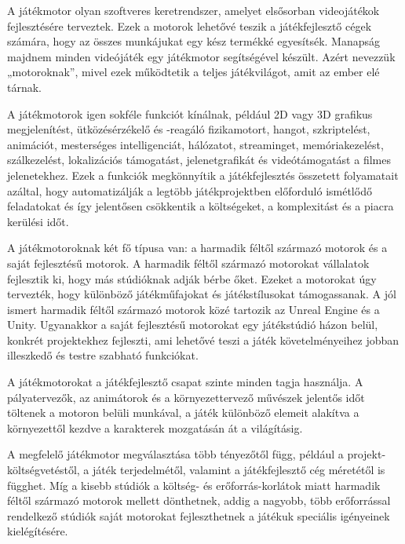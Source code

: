 \newpage


A játékmotor olyan szoftveres keretrendszer, amelyet elsősorban videojátékok fejlesztésére terveztek. Ezek a motorok lehetővé teszik a játékfejlesztő cégek számára, hogy az összes munkájukat egy kész termékké egyesítsék. Manapság majdnem minden videójáték egy játékmotor segítségével készült. Azért nevezzük „motoroknak”, mivel ezek működtetik a teljes játékvilágot, amit az ember elé tárnak.\cite{gameengine1}

A játékmotorok igen sokféle funkciót kínálnak, például 2D vagy 3D grafikus megjelenítést, ütközésérzékelő és -reagáló fizikamotort, hangot, szkriptelést, animációt, mesterséges intelligenciát, hálózatot, streaminget, memóriakezelést, szálkezelést, lokalizációs támogatást, jelenetgrafikát és videótámogatást a filmes jelenetekhez. Ezek a funkciók megkönnyítik a játékfejlesztés összetett folyamatait azáltal, hogy automatizálják a legtöbb játékprojektben előforduló ismétlődő feladatokat és így jelentősen csökkentik a költségeket, a komplexitást és a piacra kerülési időt.\cite{gameengine1}

A játékmotoroknak két fő típusa van: a harmadik féltől származó motorok és a saját fejlesztésű motorok. A harmadik féltől származó motorokat vállalatok fejlesztik ki, hogy más stúdióknak adják bérbe őket. Ezeket a motorokat úgy tervezték, hogy különböző játékműfajokat és játékstílusokat támogassanak. A jól ismert harmadik féltől származó motorok közé tartozik az Unreal Engine és a Unity. Ugyanakkor a saját fejlesztésű motorokat egy játékstúdió házon belül, konkrét projektekhez fejleszti, ami lehetővé teszi a játék követelményeihez jobban illeszkedő és testre szabható funkciókat.\cite{gameengine1}

A játékmotorokat a játékfejlesztő csapat szinte minden tagja használja. A pályatervezők, az animátorok és a környezettervező művészek jelentős időt töltenek a motoron belüli munkával, a játék különböző elemeit alakítva a környezettől kezdve a karakterek mozgatásán át a világításig.\cite{gameengine1}

A megfelelő játékmotor megválasztása több tényezőtől függ, például a projekt-költségvetéstől, a játék terjedelmétől, valamint a játékfejlesztő cég méretétől is függhet. Míg a kisebb stúdiók a költség- és erőforrás-korlátok miatt harmadik féltől származó motorok mellett dönthetnek, addig a nagyobb, több erőforrással rendelkező stúdiók saját motorokat fejleszthetnek a játékuk speciális igényeinek kielégítésére.\cite{gameengine1}


